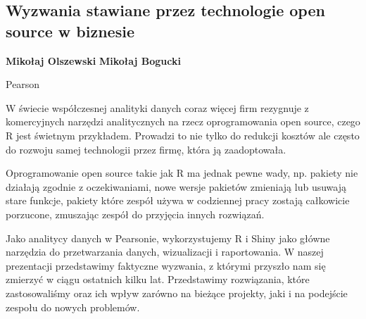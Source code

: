 \documentclass[\main/boa.tex]{subfiles}
\begin{document}
\subsection{Wyzwania stawiane przez technologie open source w biznesie}

\begin{minipage}{0.915\textwidth}
	\centering
  {\bf {} Mikołaj Olszewski}
    {\bf {} Mikołaj Bogucki }
\end{minipage}



\begin{affiliations}
\begin{minipage}{0.915\textwidth}
\centering
Pearson \\[-2pt]
\end{minipage}
\end{affiliations}

\vskip 0.3cm

W świecie współczesnej analityki danych coraz więcej firm rezygnuje z komercyjnych narzędzi analitycznych na rzecz oprogramowania open source, czego R jest świetnym przykładem. Prowadzi to nie tylko do redukcji kosztów ale często do rozwoju samej technologii przez firmę, która ją zaadoptowała.

Oprogramowanie open source takie jak R ma jednak pewne wady, np. pakiety nie działają zgodnie z oczekiwaniami, nowe wersje pakietów zmieniają lub usuwają stare funkcje, pakiety które zespół używa w codziennej pracy zostają całkowicie porzucone, zmuszając zespół do przyjęcia innych rozwiązań.

Jako analitycy danych w Pearsonie, wykorzystujemy R i Shiny jako główne narzędzia do przetwarzania danych, wizualizacji i raportowania. W naszej prezentacji przedstawimy faktyczne wyzwania, z którymi przyszło nam się zmierzyć w ciągu ostatnich kilku lat. Przedstawimy rozwiązania, które zastosowaliśmy oraz ich wpływ zarówno na bieżące projekty, jaki i na podejście zespołu do nowych problemów.
\end{document}
